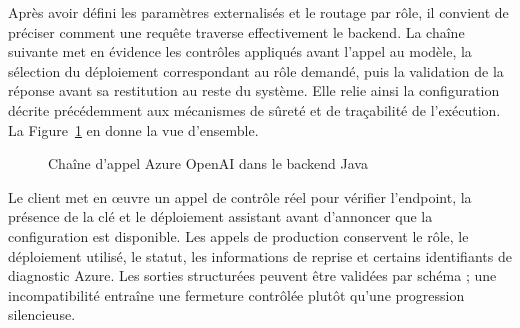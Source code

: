 Après avoir défini les paramètres externalisés et le routage par rôle, il convient de préciser comment une requête traverse effectivement le backend. La chaîne suivante met en évidence les contrôles appliqués avant l'appel au modèle, la sélection du déploiement correspondant au rôle demandé, puis la validation de la réponse avant sa restitution au reste du système. Elle relie ainsi la configuration décrite précédemment aux mécanismes de sûreté et de traçabilité de l'exécution. La Figure~\ref{fig:chaine-appel-azure-ch4} en donne la vue d'ensemble.

\begin{figure}[H]
    \centering
    \caption{Chaîne d'appel Azure OpenAI dans le backend Java}
    \label{fig:chaine-appel-azure-ch4}
\end{figure}

Le client met en œuvre un appel de contrôle réel pour vérifier l'endpoint, la présence de la clé et le déploiement assistant avant d'annoncer que la configuration est disponible. Les appels de production conservent le rôle, le déploiement utilisé, le statut, les informations de reprise et certains identifiants de diagnostic Azure. Les sorties structurées peuvent être validées par schéma ; une incompatibilité entraîne une fermeture contrôlée plutôt qu'une progression silencieuse.

